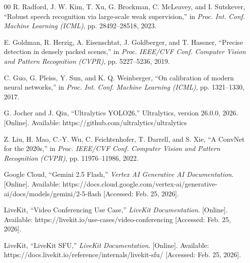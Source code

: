 \documentclass[conference]{IEEEtran}
\begin{document}
\begin{thebibliography}{00}
R. Radford, J. W. Kim, T. Xu, G. Brockman, C. McLeavey, and I. Sutskever,
``Robust speech recognition via large-scale weak supervision,''
in \emph{Proc. Int. Conf. Machine Learning (ICML)},
pp. 28492--28518, 2023.

E. Goldman, R. Herzig, A. Eisenschtat, J. Goldberger, and T. Hassner,
``Precise detection in densely packed scenes,''
in \emph{Proc. IEEE/CVF Conf. Computer Vision and Pattern Recognition (CVPR)},
pp. 5227--5236, 2019.

C. Guo, G. Pleiss, Y. Sun, and K. Q. Weinberger,
``On calibration of modern neural networks,''
in \emph{Proc. Int. Conf. Machine Learning (ICML)},
pp. 1321--1330, 2017.

G. Jocher and J. Qiu,
``Ultralytics YOLO26,''
Ultralytics, version 26.0.0, 2026.
[Online]. Available: https://github.com/ultralytics/ultralytics

Z. Liu, H. Mao, C.-Y. Wu, C. Feichtenhofer, T. Darrell, and S. Xie,
``A ConvNet for the 2020s,''
in \emph{Proc. IEEE/CVF Conf. Computer Vision and Pattern Recognition (CVPR)},
pp. 11976--11986, 2022.

Google Cloud,
``Gemini 2.5 Flash,''
\emph{Vertex AI Generative AI Documentation}.
[Online]. Available: https://docs.cloud.google.com/vertex-ai/generative-ai/docs/models/gemini/2-5-flash
[Accessed: Feb. 25, 2026].

LiveKit,
``Video Conferencing Use Case,''
\emph{LiveKit Documentation}.
[Online]. Available: https://livekit.io/use-cases/video-conferencing
[Accessed: Feb. 25, 2026].

LiveKit,
``LiveKit SFU,''
\emph{LiveKit Documentation}.
[Online]. Available: https://docs.livekit.io/reference/internals/livekit-sfu/
[Accessed: Feb. 25, 2026].

\end{thebibliography}



\vspace{12pt}
\end{document}
